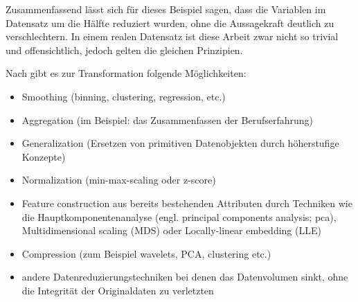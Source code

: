 Zusammenfassend lässt sich für dieses Beispiel sagen, dass die Variablen im Datensatz um die Hälfte reduziert wurden, ohne die Aussagekraft deutlich zu verschlechtern. In einem realen Datensatz ist diese Arbeit zwar nicht so trivial und offensichtlich, jedoch gelten die gleichen Prinzipien.\par
Nach \citep[S.~71; veränderte Version]{swamynathan_mastering_2017} gibt es zur Transformation folgende Möglichkeiten:
\begin{itemize}
\item Smoothing (binning, clustering, regression, etc.)
\item Aggregation (im Beispiel: das Zusammenfassen der Berufserfahrung)
\item Generalization (Ersetzen von primitiven Datenobjekten durch höherstufige Konzepte)
\item Normalization (min-max-scaling oder z-score)
\item Feature construction aus bereits bestehenden Attributen durch Techniken wie die Hauptkomponentenanalyse (engl. principal components analysis; \gls{pca}), Multidimensional scaling (MDS) oder Locally-linear embedding (LLE)
\item Compression (zum Beispiel wavelets, PCA, clustering etc.)
\item andere Datenreduzierungstechniken bei denen das Datenvolumen sinkt, ohne die Integrität der Originaldaten zu verletzten
\end{itemize}


